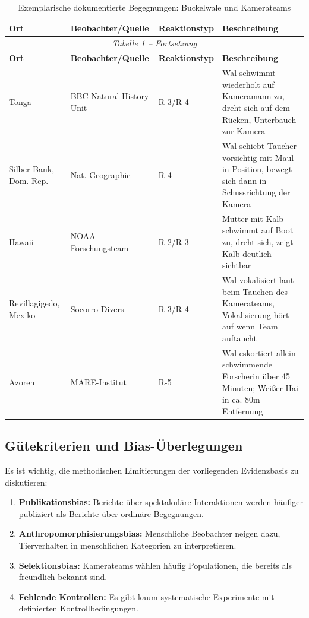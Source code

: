 ﻿\documentclass[12pt,a4paper]{article}
\theoremstyle{definition}
\theoremstyle{remark}
\begin{document}
\begin{longtable}{p{2cm}p{3cm}p{2.5cm}p{5cm}}
  \caption{Exemplarische dokumentierte Begegnungen: Buckelwale und Kamerateams}
  \label{tab:begegnungen}\\
  \toprule
  \textbf{Ort} & \textbf{Beobachter/Quelle} & \textbf{Reaktionstyp} & \textbf{Beschreibung} \\
  \midrule
  \endfirsthead
  \multicolumn{4}{c}{\textit{Tabelle \ref{tab:begegnungen} -- Fortsetzung}} \\
  \toprule
  \textbf{Ort} & \textbf{Beobachter/Quelle} & \textbf{Reaktionstyp} & \textbf{Beschreibung} \\
  \midrule
  \endhead
  \bottomrule
  \endfoot
  Tonga & BBC Natural History Unit & R-3/R-4 & Wal schwimmt wiederholt auf Kameramann zu,
  dreht sich auf dem Rücken, Unterbauch zur Kamera \\[4pt]
  Silber-Bank, Dom. Rep. & Nat. Geographic & R-4 & Wal schiebt Taucher vorsichtig mit
  Maul in Position, bewegt sich dann in Schussrichtung der Kamera \\[4pt]
  Hawaii & NOAA Forschungsteam & R-2/R-3 & Mutter mit Kalb schwimmt auf Boot zu,
  dreht sich, zeigt Kalb deutlich sichtbar \\[4pt]
  Revillagigedo, Mexiko & Socorro Divers & R-3/R-4 & Wal vokalisiert laut beim
  Tauchen des Kamerateams, Vokalisierung hört auf wenn Team auftaucht \\[4pt]
  Azoren & MARE-Institut & R-5 & Wal eskortiert allein schwimmende Forscherin
  über 45 Minuten; Weißer Hai in ca. 80m Entfernung \\
\end{longtable}

\subsection{Gütekriterien und Bias-Überlegungen}

Es ist wichtig, die methodischen Limitierungen der vorliegenden Evidenzbasis
zu diskutieren:

\begin{enumerate}
  \item \textbf{Publikationsbias:} Berichte über spektakuläre Interaktionen
        werden häufiger publiziert als Berichte über ordinäre Begegnungen.
  \item \textbf{Anthropomorphisierungsbias:} Menschliche Beobachter neigen
        dazu, Tierverhalten in menschlichen Kategorien zu interpretieren.
  \item \textbf{Selektionsbias:} Kamerateams wählen häufig Populationen,
        die bereits als freundlich bekannt sind.
  \item \textbf{Fehlende Kontrollen:} Es gibt kaum systematische Experimente
        mit definierten Kontrollbedingungen.
\end{enumerate}
\end{document}
